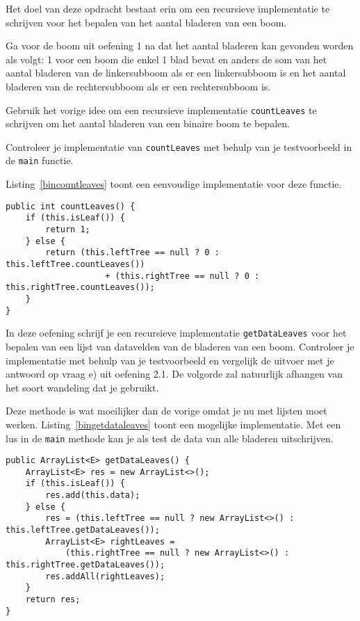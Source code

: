 \begin{oef}
\code Het doel van deze opdracht bestaat erin om een recursieve implementatie te schrijven voor het bepalen van het aantal bladeren van een boom.

\begin{oefenumerate}
	\item Ga voor de boom uit oefening 1 na dat het aantal bladeren kan gevonden worden als volgt:  1 voor een boom die enkel 1 blad bevat en anders de som van het aantal bladeren van de linkersubboom als er een linkersubboom is en het aantal bladeren van de rechtersubboom als  er een rechtersubboom is.
	\item Gebruik het vorige idee om een recursieve implementatie \verb=countLeaves= te schrijven om het aantal bladeren van een binaire boom te bepalen.
	\item Controleer je implementatie van \verb=countLeaves= met behulp van je testvoorbeeld in de \verb=main= functie.
\end{oefenumerate}
\begin{opl}
Listing~\ref{bincountleaves} toont een eenvoudige implementatie voor deze functie.
\begin{lstlisting}[caption={Hoeveel bladeren bevat deze boom?}, label=bincountleaves]
public int countLeaves() {
	if (this.isLeaf()) {
		return 1;
	} else {
		return (this.leftTree == null ? 0 : this.leftTree.countLeaves()) 
					+ (this.rightTree == null ? 0 : this.rightTree.countLeaves());
	}
}
\end{lstlisting}
\end{opl}
\end{oef}

\begin{oef}
\code In deze oefening schrijf je een recursieve implementatie \verb=getDataLeaves=  voor het bepalen van een lijst van datavelden van de bladeren van een boom. Controleer je implementatie met behulp van je testvoorbeeld en vergelijk de uitvoer met je antwoord op vraag e) uit oefening 2.1. De volgorde zal natuurlijk afhangen van het soort wandeling dat je gebruikt.
\begin{opl}
Deze methode is wat moeilijker dan de vorige omdat je nu met lijsten moet werken. Listing~\ref{bingetdataleaves} toont een mogelijke implementatie. Met een lus in de \verb+main+ methode kan je als test de data van alle bladeren uitschrijven.
\begin{lstlisting}[caption={Genereer een lijst met de data van alle bladeren}, label=bingetdataleaves]
public ArrayList<E> getDataLeaves() {
	ArrayList<E> res = new ArrayList<>();
	if (this.isLeaf()) {
		res.add(this.data);
	} else {
		res = (this.leftTree == null ? new ArrayList<>() : this.leftTree.getDataLeaves());
		ArrayList<E> rightLeaves = 
			(this.rightTree == null ? new ArrayList<>() : this.rightTree.getDataLeaves());
		res.addAll(rightLeaves);
	}
	return res;
}
\end{lstlisting}

\end{opl}
\end{oef}

